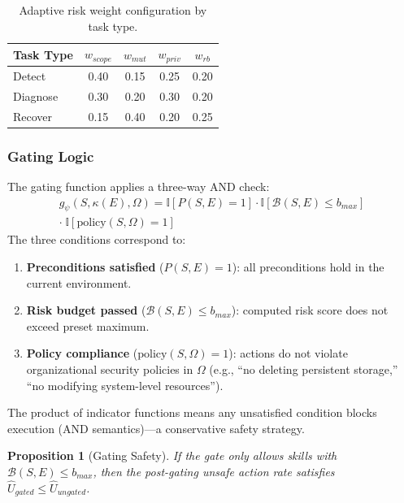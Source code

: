 \documentclass[conference,10pt]{IEEEtran}
\newtheorem{proposition}{Proposition}
\begin{document}
\begin{table}[t]
\centering
\caption{Adaptive risk weight configuration by task type.}
\label{tab:adaptive-weights}
\small
\begin{tabular}{lcccc}
\toprule
\textbf{Task Type} & $w_{scope}$ & $w_{mut}$ & $w_{priv}$ & $w_{rb}$ \\
\midrule
Detect & 0.40 & 0.15 & 0.25 & 0.20 \\
Diagnose & 0.30 & 0.20 & 0.30 & 0.20 \\
Recover & 0.15 & 0.40 & 0.20 & 0.25 \\
\bottomrule
\end{tabular}
\end{table}

\subsubsection{Gating Logic}
The gating function applies a three-way AND check:
\begin{multline}
g_\psi(S,\kappa(E),\Omega) = \mathbb{I}[P(S,E){=}1] \cdot \mathbb{I}[\mathcal{B}(S,E){\le}b_{max}]\\
\cdot\; \mathbb{I}[\text{policy}(S,\Omega){=}1]
\end{multline}
The three conditions correspond to:
\begin{enumerate}
  \item \textbf{Preconditions satisfied} ($P(S, E)=1$): all preconditions hold in the current environment.
  \item \textbf{Risk budget passed} ($\mathcal{B}(S,E) \le b_{max}$): computed risk score does not exceed preset maximum.
  \item \textbf{Policy compliance} ($\text{policy}(S,\Omega)=1$): actions do not violate organizational security policies in $\Omega$ (e.g., ``no deleting persistent storage,'' ``no modifying system-level resources'').
\end{enumerate}
The product of indicator functions means any unsatisfied condition blocks execution (AND semantics)---a conservative safety strategy.

\begin{proposition}[Gating Safety]
If the gate only allows skills with $\mathcal{B}(S,E) \le b_{max}$, then the post-gating unsafe action rate satisfies $\hat{U}_{gated} \le \hat{U}_{ungated}$.
\end{proposition}
\end{document}
